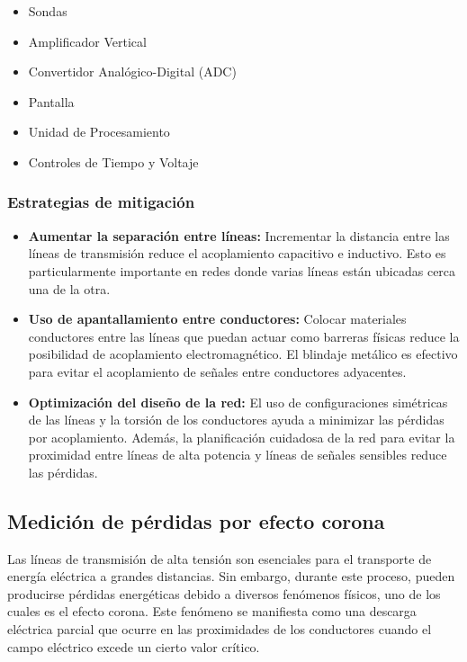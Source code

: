             \begin{itemize}
                \item Sondas
                \item Amplificador Vertical
                \item Convertidor Analógico-Digital (ADC)
                \item Pantalla
                \item Unidad de Procesamiento
                \item Controles de Tiempo y Voltaje
            \end{itemize}

        \subsubsection{Estrategias de mitigación}

            \begin{itemize}
                \item \textbf{Aumentar la separación entre líneas:} Incrementar la distancia entre las líneas de transmisión reduce el acoplamiento capacitivo e inductivo. Esto es particularmente importante en redes donde varias líneas están ubicadas cerca una de la otra.

                \item \textbf{Uso de apantallamiento entre conductores: } Colocar materiales conductores entre las líneas que puedan actuar como barreras físicas reduce la posibilidad de acoplamiento electromagnético. El blindaje metálico es efectivo para evitar el acoplamiento de señales entre conductores adyacentes.

                \item \textbf{Optimización del diseño de la red: }   El uso de configuraciones simétricas de las líneas y la torsión de los conductores ayuda a minimizar las pérdidas por acoplamiento. Además, la planificación cuidadosa de la red para evitar la proximidad entre líneas de alta potencia y líneas de señales sensibles reduce las pérdidas.
            \end{itemize}

    \subsection{Medición de pérdidas por efecto corona}

        Las líneas de transmisión de alta tensión son esenciales para el transporte de energía eléctrica a grandes distancias. Sin embargo, durante este proceso, pueden producirse pérdidas energéticas debido a diversos fenómenos físicos, uno de los cuales es el efecto corona. Este fenómeno se manifiesta como una descarga eléctrica parcial que ocurre en las proximidades de los conductores cuando el campo eléctrico excede un cierto valor crítico.
        
